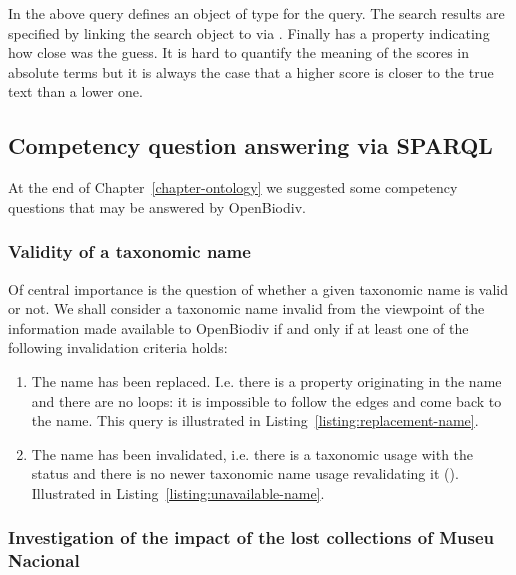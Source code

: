 In the above query  defines an object of type  for the query. The search results are specified by linking the search object to  via . Finally  has a  property indicating how close was the guess. It is hard to quantify the meaning of the scores in absolute terms but it is always the case that a higher score is closer to the true text than a lower one.

\subsection{Competency question answering via SPARQL}

At the end of Chapter~\ref{chapter-ontology} we suggested some competency questions that may be answered by OpenBiodiv.

\subsubsection{Validity of a taxonomic name}

Of central importance is the question of whether a given taxonomic name is valid or not. We shall consider a taxonomic name invalid from the viewpoint of the information made available to OpenBiodiv if and only if at least one of the following invalidation criteria holds:

\begin{enumerate}
\item{The name has been replaced. I.e. there is a  property originating in the name and there are no loops: it is impossible to follow the  edges and come back to the name. This query is illustrated in Listing~\ref{listing:replacement-name}}.
\item{The name has been invalidated, i.e. there is a taxonomic usage with the status  and there is no newer taxonomic name usage revalidating it (). Illustrated in Listing~\ref{listing:unavailable-name}.}
\end{enumerate}



\subsubsection{Investigation of the impact of the lost collections of Museu Nacional}

